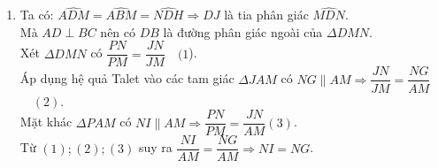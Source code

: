 \begin{ex}
{\begin{enumerate}
        $\Rightarrow$ Tứ giác $BNMC$ nội tiếp (tứ giác có hai đỉnh $M,N$ cùng nhìn $BC$ dưới một góc vuông). Suy ra $\widehat {ABC} + \widehat {NMC} = {180^0}$ mà $\widehat {NMA} + \widehat {NMC} = {180^0}\Rightarrow\widehat {AMN} = \widehat {ABC}$\\
        Dựng tiếp tuyến $Ax$ với đường tròn $(O)$ tại $A$, ta có $\widehat {xAC} = \widehat {ABC}$.\\
        Do đó $\widehat {xAC} = \widehat {AMN}$ (hai góc ở vị trí so le trong) nên $Ax\parallel MN$.\\
        Ta lại có $OA\perp Ax$. Do đó $OA\perp MN$.
         \item Ta có: $\widehat {ADM} = \widehat {ABM} = \widehat {NDH} \Rightarrow DJ$ là tia phân giác $\widehat {MDN}$.\\
             Mà $AD\perp BC$ nên có $DB$ là đường phân giác ngoài của $\Delta DMN$.\\
             Xét $\Delta DMN$ có $\dfrac{PN}{PM}=\dfrac{JN}{JM}$~~$(1$).\\
             Áp dụng hệ quả Talet vào các tam giác $\Delta JAM $ có $NG\parallel AM \Rightarrow \dfrac{JN}{JM}=\dfrac{NG}{AM}$ ~~$(2)$.\\
             Mặt khác $\Delta PAM$ có $NI\parallel AM\Rightarrow \dfrac{PN}{PM}=\dfrac{JN}{AM}$$(3)$.\\
             Từ $(1);(2);(3)$ suy ra $\dfrac{NI}{AM}=\dfrac{NG}{AM}\Rightarrow NI=NG$.
            \end{enumerate}
    }
\end{ex}
